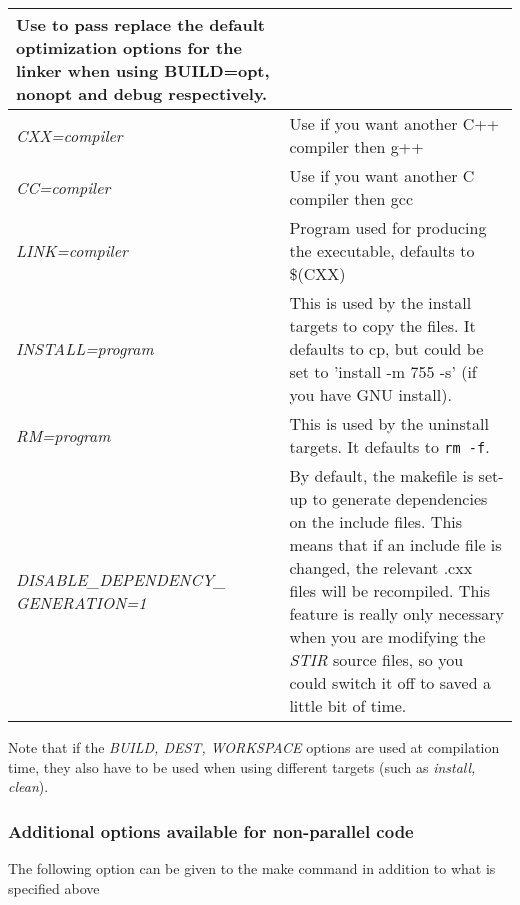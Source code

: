 \documentclass{article}
\begin{document}
\begin{longtable}{|p{\MakeTableFirstCol}|p{\MakeTableSecondCol}|}
{\raggedright
Use to pass replace the default optimization options for the linker when using BUILD=opt, nonopt and debug respectively.} \\
\hline

{\raggedright
\textit{CXX=compiler}} & 

{\raggedright
Use if you want another C++ compiler then g++} \\
\hline

{\raggedright
\textit{CC=compiler}} & 

{\raggedright
Use if you want another C compiler then gcc} \\
\hline

{\raggedright
\textit{LINK=compiler}} & 

{\raggedright
Program used for producing the executable, defaults to \$(CXX)} \\
\hline

{\raggedright
\textit{INSTALL=program}} & 

{\raggedright
This is used by the install targets to copy the files. It defaults 
to cp, but could be set to 'install -m 755 -s' (if you have GNU 
install).} \\
\hline

{\raggedright
\textit{RM=program}} & 

{\raggedright
This is used by the uninstall targets. It defaults to \texttt{rm -f}.} \\
\hline

{\raggedright
\textit{DISABLE\_DEPENDENCY\_\linebreak
GENERATION=1}} & 

{\raggedright
By default, the makefile is set-up to generate dependencies 
on the include files. This means that if an include file is changed, 
the relevant .cxx files will be recompiled. This feature is really 
only necessary when you are modifying the \textit{STIR} source files, 
so you could switch it off to saved a little bit of time.} \\
\hline
\end{longtable}


Note that if the \textit{BUILD, DEST, WORKSPACE} options are used at 
compilation time, they also have to be used when using different 
targets (such as \textit{install, clean}).
\subsubsection{
Additional options available for non-parallel code}
\label{sec:compilationgraphics}
The following option can be given to the make command in addition 
to what is specified above
\end{document}
